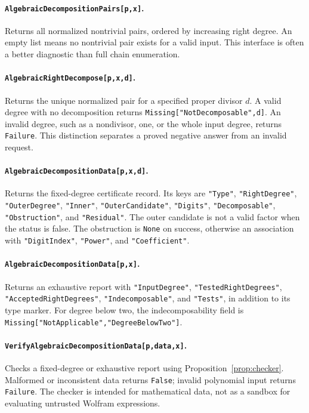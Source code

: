 \documentclass[11pt,a4paper]{article}
\numberwithin{equation}{section}
\theoremstyle{definition}
\theoremstyle{remark}
\newcommand{\code}[1]{\texttt{#1}}
\begin{document}
\paragraph{\code{AlgebraicDecompositionPairs[p,x]}.}
Returns all normalized nontrivial pairs, ordered by increasing right degree.
An empty list means no nontrivial pair exists for a valid input. This interface
is often a better diagnostic than full chain enumeration.

\paragraph{\code{AlgebraicRightDecompose[p,x,d]}.}
Returns the unique normalized pair for a specified proper divisor $d$.
A valid degree with no decomposition returns
\code{Missing["NotDecomposable",d]}. An invalid degree, such as a nondivisor,
one, or the whole input degree, returns \code{Failure}. This distinction
separates a proved negative answer from an invalid request.

\paragraph{\code{AlgebraicDecompositionData[p,x,d]}.}
Returns the fixed-degree certificate record. Its keys are \code{"Type"},
\code{"RightDegree"}, \code{"OuterDegree"}, \code{"Inner"},
\code{"OuterCandidate"}, \code{"Digits"}, \code{"Decomposable"},
\code{"Obstruction"}, and \code{"Residual"}. The outer candidate is not a
valid factor when the status is false. The obstruction is \code{None} on
success, otherwise an association with \code{"DigitIndex"}, \code{"Power"},
and \code{"Coefficient"}.

\paragraph{\code{AlgebraicDecompositionData[p,x]}.}
\begingroup\raggedright
Returns an exhaustive report with \code{"InputDegree"},
\code{"TestedRightDegrees"}, \code{"AcceptedRightDegrees"},
\code{"Indecomposable"}, and \code{"Tests"}, in addition to its type marker.
For degree below two, the indecomposability field is
\code{Missing["NotApplicable","DegreeBelowTwo"]}.\par\endgroup

\paragraph{\code{VerifyAlgebraicDecompositionData[p,data,x]}.}
Checks a fixed-degree or exhaustive report using
Proposition~\ref{prop:checker}. Malformed or inconsistent data returns
\code{False}; invalid polynomial input returns \code{Failure}. The checker
is intended for mathematical data, not as a sandbox for evaluating untrusted
Wolfram expressions.
\end{document}
